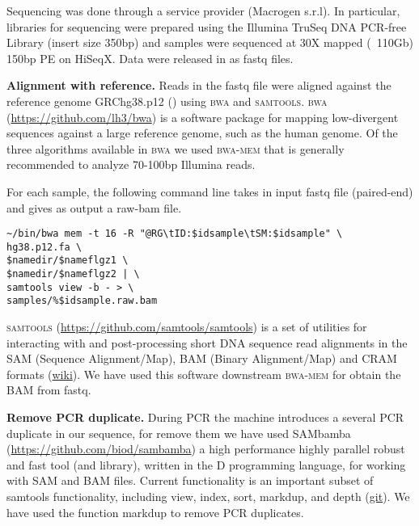 Sequencing was done through a service provider (Macrogen s.r.l). In particular, libraries for sequencing were prepared using the Illumina TruSeq DNA PCR-free Library (insert size 350bp) and samples were sequenced at 30X mapped (~110Gb) 150bp PE on HiSeqX. Data were released in as fastq files. 

\textbf{Alignment with reference.} Reads in the fastq file were aligned against the reference genome GRChg38.p12 (\cite{rosenbloom2015ucsc}) using \textsc{bwa} and \textsc{samtools}. \textsc{bwa} (\url{https://github.com/lh3/bwa}) is a software package for mapping low-divergent sequences against a large reference genome, such as the human genome. Of the three algorithms available in \textsc{bwa} we used \textsc{bwa-mem}  that is generally recommended to analyze 70-100bp Illumina reads. 

For each sample, the following command line takes in input fastq file (paired-end) and gives as output a raw-bam file. 

\begin{verbatim}
~/bin/bwa mem -t 16 -R "@RG\tID:$idsample\tSM:$idsample" \
hg38.p12.fa \ 
$namedir/$nameflgz1 \ 
$namedir/$nameflgz2 | \ 
samtools view -b - > \
samples/%$idsample.raw.bam
\end{verbatim}
  


\textsc{samtools} (\url{https://github.com/samtools/samtools}) is a set of utilities for interacting with and post-processing short DNA sequence read alignments in the SAM (Sequence Alignment/Map), BAM (Binary Alignment/Map) and CRAM formats (\href{https://en.wikipedia.org/wiki/SAMtools}{wiki}). \newline
We have used this software downstream \textsc{bwa-mem} for obtain the BAM from fastq. \newline

\textbf{Remove PCR duplicate.} During PCR the machine introduces a several PCR duplicate in our sequence, for remove them we have used SAMbamba (\url{https://github.com/biod/sambamba}) a high performance highly parallel robust and fast tool (and library), written in the D programming language, for working with SAM and BAM files. Current functionality is an important subset of samtools functionality, including view, index, sort, markdup, and depth (\href{https://github.com/biod/sambamba#introduction}{git}). We have used the function markdup to remove PCR duplicates. \newline

